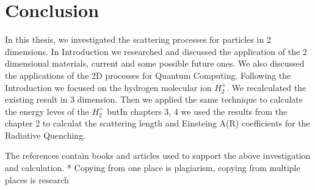 \chapter{Conclusion}
\label{conclusion}

In this thesis, we investigated the scattering processes for particles in 2 dimensions. In Introduction we researched and discussed the application of the 2 dimensional materials, current and some possible future ones. We also discussed the applications of the 2D processes for Quantum Computing.
Following the Introduction we focused on the hydrogen molecular ion $ H_2^{+} $. We recalculated the existing result in 3 dimension. 
Then we applied the same technique to calculate the energy leves of the $ H_2^{+} $ butIn chapters 3, 4 we used the results from the chapter 2 to calculat the scattering length and Einsteing A(R) coefficients for the Radiative Quenching.

The references contain books and articles used to support the above investigation and calculation.
* Copying from one place is plagiarism, copying from multiple places is research


